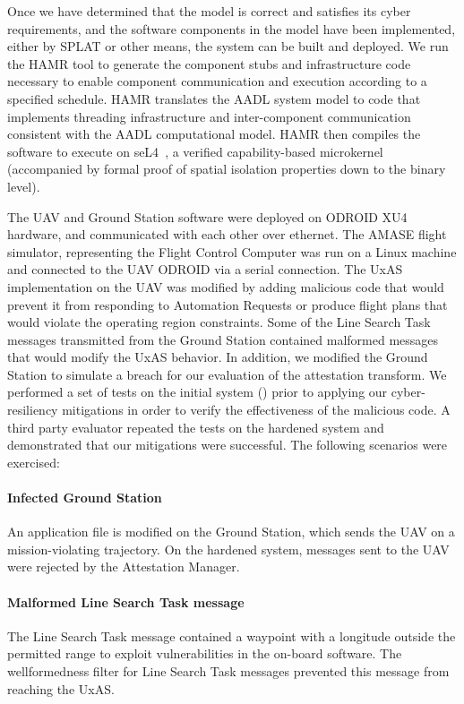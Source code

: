 Once we have determined that the model is correct and satisfies its cyber requirements, and the software components in the model have been implemented, either by SPLAT or other means, the system can be built and deployed.  We run the HAMR tool to generate the component stubs and infrastructure code necessary to enable component communication and execution according to a specified schedule.
HAMR translates the AADL system model to code that implements threading infrastructure and inter-component communication consistent with the AADL computational model.
%
HAMR then compiles the software to execute on seL4~\cite{sel4-2009}, a verified capability-based microkernel (accompanied by formal proof of spatial isolation properties down to the binary level).

The UAV and Ground Station software were deployed on ODROID XU4 hardware, and communicated with each other over ethernet.  The AMASE flight simulator, representing the Flight Control Computer was run on a Linux machine and connected to the UAV ODROID via a serial connection.  The UxAS implementation on the UAV was modified by adding malicious code that would prevent it from responding to Automation Requests or produce flight plans that would violate the operating region constraints.  Some of the Line Search Task messages transmitted from the Ground Station contained malformed messages that would modify the UxAS behavior. In addition, we modified the Ground Station to simulate a breach for our evaluation of the attestation transform.
%
We performed a set of tests on the initial system () prior to applying our cyber-resiliency mitigations in order to verify the effectiveness of the malicious code.
A third party evaluator repeated the tests on the hardened system and %
demonstrated that our mitigations were successful.
The following scenarios were exercised:

\paragraph{Infected Ground Station} An application file is modified on the Ground Station, which sends the UAV on a mission-violating trajectory.
On the hardened system, messages sent to the UAV were rejected by the Attestation Manager.

\paragraph{Malformed Line Search Task message} The Line Search Task message contained a waypoint with a longitude outside the permitted range to exploit vulnerabilities in the on-board software.  The wellformedness filter for Line Search Task messages prevented this message from reaching the UxAS.

